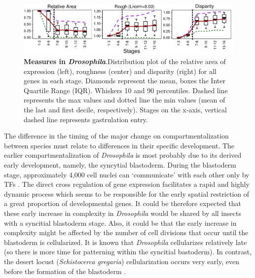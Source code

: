 \begin{figure}[b]
  \includegraphics[width=\textwidth]{./Images/Art-I/3_measures.png}
  \centering
  \caption{\textbf{Measures in \textit{Drosophila}}.Distribution plot of the relative area of expression (left), roughness (center) and disparity (right) for all genes in each stage. Diamonds represent the mean, boxes the Inter Quartile Range (IQR). Whiskers 10 and 90 percentiles. Dashed line represents the max values and dotted line the min values (mean of the last and first decile, respectively). Stages on the x-axis, vertical dashed line represents gastrulation entry.
  }
  \label{fig:Art-I-3measures}
\end{figure}


The difference in the timing of the major change on compartmentalization between species must relate to differences in their specific development.
The earlier compartmentalization of \textit{Drosophila} is most probably due to its derived early development, namely, the syncytial blastoderm. 
During the blastoderm stage, approximately 4,000 cell nuclei can `communicate' with each other only by TFs \citep{Jaeger2011}. The direct cross regulation of gene expression facilitates a rapid and highly dynamic process which seems to be responsible for the early spatial restriction of a great proportion of developmental genes.
It could be therefore expected that these early increase in complexity in \textit{Drosophila} would be shared by all insects with a syncitial blastoderm stage. Also, it could be that the early increase in complexity might be affected by the number of cell divisions that occur until the blastoderm is cellularized. It is known that \textit{Drosophila} cellularizes relatively late (so there is more time for patterning within the syncitial bastoderm). In contrast, the desert locust (\textit{Schistocerca gregaria}) cellularization occurs very early, even before the formation of the blastoderm \citep{Ho1997}.

